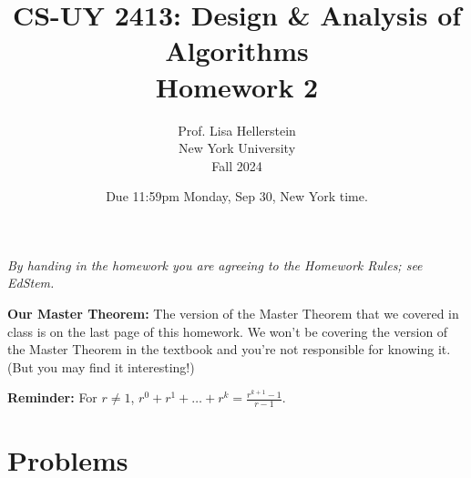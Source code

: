 \documentclass{article}
\title{CS-UY 2413: Design \& Analysis of Algorithms \\ Homework 2}
\author{Prof. Lisa Hellerstein \\ New York University \\ Fall 2024}
\date{Due 11:59pm Monday, Sep 30, New York time.}
\begin{document}
\maketitle

\textit{By handing in the homework you are agreeing to the Homework Rules; see EdStem.}

\textbf{Our Master Theorem:} The version of the Master Theorem that we covered in class is on the last page of this homework. We won’t be covering the version of the Master Theorem in the textbook and you’re not responsible for knowing it. (But you may find it interesting!)

\textbf{Reminder:} For $r \neq 1$, $r^0 + r^1 + \dots + r^k = \frac{r^{k+1} - 1}{r - 1}$.

\section*{Problems}
\end{document}

